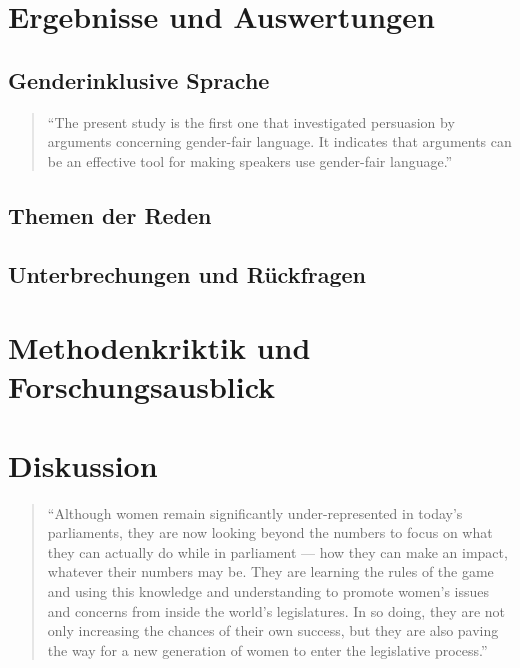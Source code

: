 \documentclass[12pt, 
    twoside=false, 
    bibliography=totoc, 
    numbers=endperiod, 
    headings=normal, 
    toc=chapterentrydotfill
    ]{scrbook}
\begin{document}
\chapter{Ergebnisse und Auswertungen}

\section{Genderinklusive Sprache}

\begin{quote}
    \enquote {The present study is the first one that investigated persuasion by arguments concerning gender-fair language. It indicates that arguments can be an effective tool for making speakers use gender-fair language.} \parencite[556]{koeser_2014}
\end{quote} 

\section{Themen der Reden}

\section{Unterbrechungen und Rückfragen}

\chapter{Methodenkriktik und Forschungsausblick}

\chapter{Diskussion}

\begin{quote}
    \enquote{Although women remain significantly under-represented in today’s parliaments, they are now looking beyond the numbers to focus on what they can actually do while in parliament — how they can make an impact, whatever their numbers may be. They are learning the rules of the game and using this knowledge and understanding to promote women’s issues and concerns from inside the world’s legislatures. In so doing, they are not only increasing the chances of their own success, but they are also paving the way for a new generation of women to enter the legislative process.} \parencite[3]{lovenduski_2015}
\end{quote}

\printbibliography[title={Literaturverzeichnis}]
\end{document}
